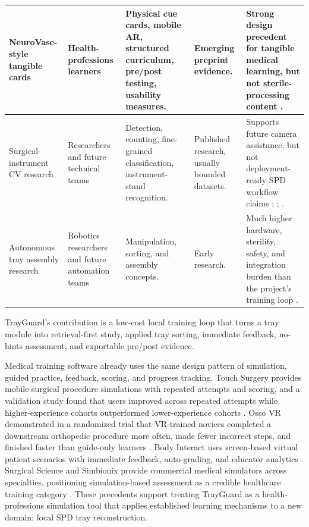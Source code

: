 \documentclass[10pt,a4paper]{article}
\begin{document}
\begin{table}[H]
\begin{tabularx}{\textwidth}{|>{\raggedright\arraybackslash}p{2.5cm}|>{\raggedright\arraybackslash}p{2.5cm}|>{\raggedright\arraybackslash}X|>{\raggedright\arraybackslash}p{2cm}|>{\raggedright\arraybackslash}X|}
\hline
NeuroVase-style tangible cards & Health-professions learners & Physical cue cards, mobile AR, structured curriculum, pre/post testing, usability measures. & Emerging preprint evidence. & Strong design precedent for tangible medical learning, but not sterile-processing content \cite{jahani-et-al-2026-neurovase}. \\
\hline
Surgical-instrument CV research & Researchers and future technical teams & Detection, counting, fine-grained classification, instrument-stand recognition. & Published research, usually bounded datasets. & Supports future camera assistance, but not deployment-ready SPD workflow claims \cite{deol-et-al-2024}; \cite{atabuzzaman-et-al-2025}; \cite{kienle-et-al-2025}. \\
\hline
Autonomous tray assembly research & Robotics researchers and future automation teams & Manipulation, sorting, and assembly concepts. & Early research. & Much higher hardware, sterility, safety, and integration burden than the project's training loop \cite{da-silva-et-al-2026}. \\
\hline
\end{tabularx}
\end{table}
TrayGuard's contribution is a low-cost local training loop that turns a tray
module into retrieval-first study, applied tray sorting, immediate feedback,
no-hints assessment, and exportable pre/post evidence.

Medical training software already uses the same design pattern of simulation,
guided practice, feedback, scoring, and progress tracking. Touch Surgery
provides mobile surgical procedure simulations with repeated attempts and
scoring, and a validation study found that users improved across repeated
attempts while higher-experience cohorts outperformed lower-experience cohorts
\cite{tulipan-et-al-2019}. Osso VR demonstrated in a randomized trial that
VR-trained novices completed a downstream orthopedic procedure more often, made
fewer incorrect steps, and finished faster than guide-only learners
\cite{orland-et-al-2020}. Body Interact uses screen-based virtual patient
scenarios with immediate feedback, auto-grading, and educator analytics
\cite{wolters-kluwer-body-interact-accessed-2026}. Surgical Science and
Simbionix provide commercial medical simulators across specialties,
positioning simulation-based assessment as a credible healthcare training
category \cite{surgical-science-simulators-accessed-2026}. These precedents
support treating TrayGuard as a health-professions simulation tool that applies
established learning mechanisms to a new domain: local SPD tray reconstruction.
\end{document}
